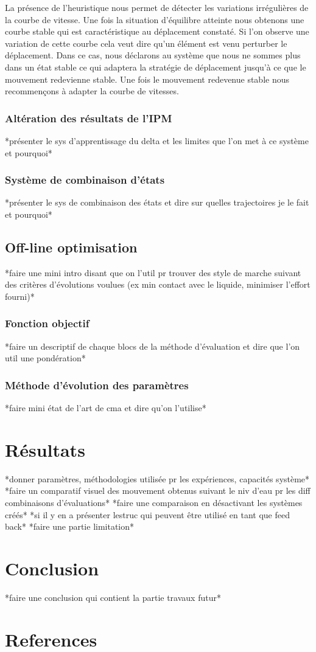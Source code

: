 \documentclass{llncs}
\begin{document}
La présence de l'heuristique nous permet de détecter les variations irrégulières de la courbe de vitesse. Une fois la situation d'équilibre atteinte nous obtenons une courbe stable qui est caractéristique au déplacement constaté. Si l'on observe une variation de cette courbe cela veut dire qu'un élément est venu perturber le déplacement. Dans ce cas, nous déclarons au système que nous ne sommes plus dans un état stable ce qui adaptera la stratégie de déplacement jusqu'à ce que le mouvement redevienne stable. Une fois le mouvement redevenue stable nous recommençons à adapter la courbe de vitesses.
%
\subsubsection{Altération des résultats de l'IPM}
\label{sec:ipm_alt}
%
*présenter le sys d'apprentissage du delta et les limites que l'on met à ce système et pourquoi*
%

\subsubsection{Système de combinaison d'états}
\label{sec:multi_state}
%
*présenter le sys de combinaison des états et dire sur quelles trajectoires je le fait et pourquoi*
% 
\subsection{Off-line optimisation}
%
*faire une mini intro disant que on l'util pr trouver des style de marche suivant des critères d'évolutions voulues (ex min contact avec le liquide, minimiser l'effort fourni)*
%
\subsubsection{Fonction objectif}
%
*faire un descriptif de chaque blocs de la méthode d'évaluation et dire que l'on util une pondération*
%
\subsubsection{Méthode d'évolution des paramètres}
%
*faire mini état de l'art de cma et dire qu'on l'utilise*
%




%
\section{Résultats}
%
*donner paramètres, méthodologies utilisée pr les expériences, capacités système*
*faire un comparatif visuel des mouvement obtenus suivant le niv d'eau pr les diff combinaisons d'évaluations*
*faire une comparaison en désactivant les systèmes créés*
*si il y en a présenter lestruc qui peuvent être utilisé en tant que feed back*
*faire une partie limitation*

\section{Conclusion}
%
*faire une conclusion qui contient la partie travaux futur*
%

\section{References}
%

%
\nocite{*}


%
\end{document}
